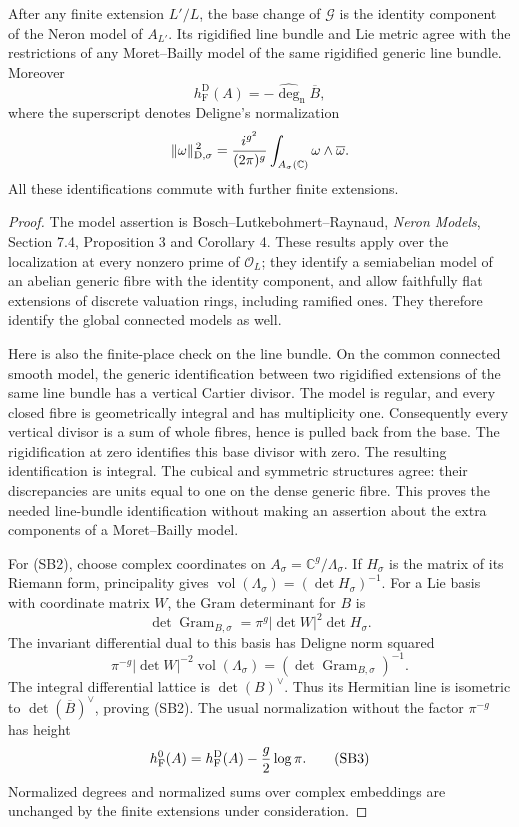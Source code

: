 \begin{srlemma}\label{lem:sr-slope-model-metric}
After any finite extension \(L'/L\), the
base change of \(\mathcal G\) is the identity
component of the Neron model of \(A_{L'}\).
Its rigidified line bundle and Lie metric
agree with the restrictions of any
Moret--Bailly model of the same rigidified
generic line bundle.
Moreover
\[
 h_{\mathrm F}^{\mathrm D}(A)
       =-\widehat{\deg}_{\mathrm n}\overline B,        \tag{SB2}
\]
where the superscript denotes Deligne's
normalization
\[
 \|\omega\|_{\mathrm D,\sigma}^{\,2}
   ={i^{g^2}\over(2\pi)^g}
                  \int_{A_\sigma(\mathbb C)}
                         \omega\wedge\overline\omega .
\]
All these identifications commute with
further finite extensions.
\end{srlemma}

\begin{proof}
The model assertion is
Bosch--Lutkebohmert--Raynaud,
\emph{Neron Models}, Section 7.4, Proposition 3
and Corollary 4.
These results apply over the localization at
every nonzero prime of \(\mathcal O_L\);
they identify a semiabelian model of an abelian
generic fibre with the identity component,
and allow faithfully flat extensions of
discrete valuation rings, including ramified ones.
They therefore identify the global connected
models as well.

Here is also the finite-place check on the
line bundle.
On the common connected smooth model,
the generic identification between two
rigidified extensions of the same line bundle
has a vertical Cartier divisor.
The model is regular, and every closed fibre
is geometrically integral and has multiplicity
one.
Consequently every vertical divisor is a sum
of whole fibres, hence is pulled back from
the base.
The rigidification at zero identifies this
base divisor with zero.
The resulting identification is integral.
The cubical and symmetric structures agree:
their discrepancies are units equal to one
on the dense generic fibre.
This proves the needed line-bundle
identification without making an assertion
about the extra components of a
Moret--Bailly model.

For (SB2), choose complex coordinates on
\(A_\sigma=\mathbb C^g/\Lambda_\sigma\).
If \(H_\sigma\) is the matrix of its Riemann
form, principality gives
\(\operatorname{vol}(\Lambda_\sigma)=
(\det H_\sigma)^{-1}\).
For a Lie basis with coordinate matrix \(W\),
the Gram determinant for \(B\) is
\[
             \det\operatorname{Gram}_{B,\sigma}
                =\pi^g|\det W|^2\det H_\sigma .
\]
The invariant differential dual to this basis
has Deligne norm squared
\[
 \pi^{-g}|\det W|^{-2}
                 \operatorname{vol}(\Lambda_\sigma)
             =(\det\operatorname{Gram}_{B,\sigma})^{-1}.
\]
The integral differential lattice is
\(\det(B)^\vee\).
Thus its Hermitian line is isometric to
\(\det(\overline B)^\vee\), proving (SB2).
The usual normalization without the factor
\(\pi^{-g}\) has height
\[
 h_{\mathrm F}^{0}(A)
       =h_{\mathrm F}^{\mathrm D}(A)
                         -{g\over2}\log\pi.           \tag{SB3}
\]
Normalized degrees and normalized sums over
complex embeddings are unchanged by the
finite extensions under consideration.
\end{proof}

